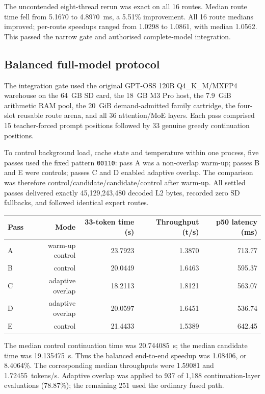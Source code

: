 The uncontended eight-thread rerun was exact on all 16 routes.  Median route
time fell from 5.1670 to 4.8970~ms, a 5.51\% improvement.  All 16 route medians
improved; per-route speedups ranged from 1.0298 to 1.0861, with median 1.0562.
This passed the narrow gate and authorised complete-model integration.

\subsection{Balanced full-model protocol}

The integration gate used the original GPT-OSS 120B Q4\_K\_M/MXFP4 warehouse
on the 64~GB SD card, the 18~GB M3 Pro host, the 7.9~GiB arithmetic RAM pool,
the 20~GiB demand-admitted family cartridge, the four-slot reusable route
arena, and all 36 attention/MoE layers.  Each pass comprised 15 teacher-forced
prompt positions followed by 33 genuine greedy continuation positions.

To control background load, cache state and temperature within one process,
five passes used the fixed pattern \texttt{00110}: pass A was a non-overlap
warm-up; passes B and E were controls; passes C and D enabled adaptive overlap.
The comparison was therefore control/candidate/candidate/control after warm-up.
All settled passes delivered exactly 45,129,243,480 decoded L2 bytes, recorded
zero SD fallbacks, and followed identical expert routes.

\begin{center}
\begin{tabular}{lrrrr}
\toprule
Pass & Mode & 33-token time (s) & Throughput (t/s) & p50 latency (ms) \\
\midrule
A & warm-up control & 23.7923 & 1.3870 & 713.77 \\
B & control & 20.0449 & 1.6463 & 595.37 \\
C & adaptive overlap & 18.2113 & 1.8121 & 563.07 \\
D & adaptive overlap & 20.0597 & 1.6451 & 536.74 \\
E & control & 21.4433 & 1.5389 & 642.45 \\
\bottomrule
\end{tabular}
\end{center}

The median control continuation time was 20.744085~s; the median candidate time
was 19.135475~s.  Thus the balanced end-to-end speedup was 1.08406, or 8.4064\%.
The corresponding median throughputs were 1.59081 and 1.72455~tokens/s.
Adaptive overlap was applied to 937 of 1,188 continuation-layer evaluations
(78.87\%); the remaining 251 used the ordinary fused path.

